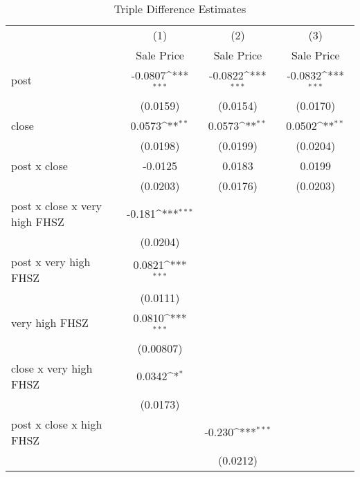 \begin{table}[htbp]\centering
\def\sym#1{\ifmmode^{#1}\else\(^{#1}\)\fi}
\caption{Triple Difference Estimates\label{tabl}}
\begin{tabular}{l*{3}{c}}
\hline\hline
                    &\multicolumn{1}{c}{(1)}&\multicolumn{1}{c}{(2)}&\multicolumn{1}{c}{(3)}\\
                    &\multicolumn{1}{c}{Sale Price}&\multicolumn{1}{c}{Sale Price}&\multicolumn{1}{c}{Sale Price}\\
\hline
post                &     -0.0807\sym{***}&     -0.0822\sym{***}&     -0.0832\sym{***}\\
                    &    (0.0159)         &    (0.0154)         &    (0.0170)         \\
[1em]
close               &      0.0573\sym{**} &      0.0573\sym{**} &      0.0502\sym{**} \\
                    &    (0.0198)         &    (0.0199)         &    (0.0204)         \\
[1em]
post x close        &     -0.0125         &      0.0183         &      0.0199         \\
                    &    (0.0203)         &    (0.0176)         &    (0.0203)         \\
[1em]
post x close x very high FHSZ&      -0.181\sym{***}&                     &                     \\
                    &    (0.0204)         &                     &                     \\
[1em]
post x very high FHSZ&      0.0821\sym{***}&                     &                     \\
                    &    (0.0111)         &                     &                     \\
[1em]
very high FHSZ      &      0.0810\sym{***}&                     &                     \\
                    &   (0.00807)         &                     &                     \\
[1em]
close x very high FHSZ&      0.0342\sym{*}  &                     &                     \\
                    &    (0.0173)         &                     &                     \\
[1em]
post x close x high FHSZ&                     &      -0.230\sym{***}&                     \\
                    &                     &    (0.0212)         &                     \\

\end{tabular}
\end{table}
